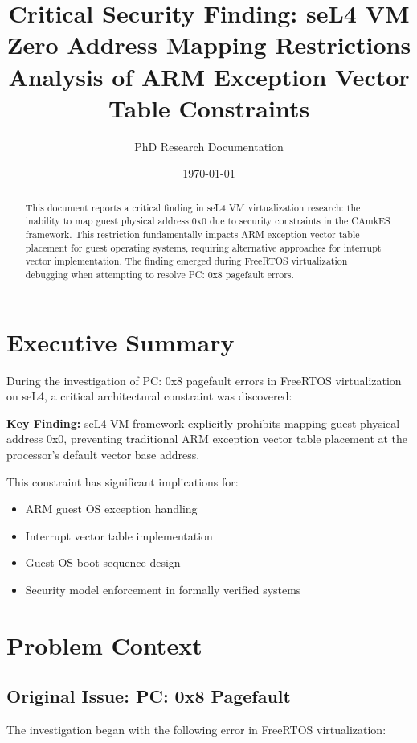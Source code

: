 \documentclass[11pt,a4paper]{article}
\title{Critical Security Finding: seL4 VM Zero Address Mapping Restrictions\\
{\large Analysis of ARM Exception Vector Table Constraints}}
\author{PhD Research Documentation}
\date{\today}
\begin{document}
\maketitle

\begin{abstract}
This document reports a critical finding in seL4 VM virtualization research: the inability to map guest physical address 0x0 due to security constraints in the CAmkES framework. This restriction fundamentally impacts ARM exception vector table placement for guest operating systems, requiring alternative approaches for interrupt vector implementation. The finding emerged during FreeRTOS virtualization debugging when attempting to resolve PC: 0x8 pagefault errors.
\end{abstract}

\tableofcontents
\newpage

\section{Executive Summary}

During the investigation of PC: 0x8 pagefault errors in FreeRTOS virtualization on seL4, a critical architectural constraint was discovered:

\textbf{Key Finding:} seL4 VM framework explicitly prohibits mapping guest physical address 0x0, preventing traditional ARM exception vector table placement at the processor's default vector base address.

This constraint has significant implications for:
\begin{itemize}
    \item ARM guest OS exception handling
    \item Interrupt vector table implementation
    \item Guest OS boot sequence design
    \item Security model enforcement in formally verified systems
\end{itemize}

\section{Problem Context}

\subsection{Original Issue: PC: 0x8 Pagefault}

The investigation began with the following error in FreeRTOS virtualization:
\end{document}

